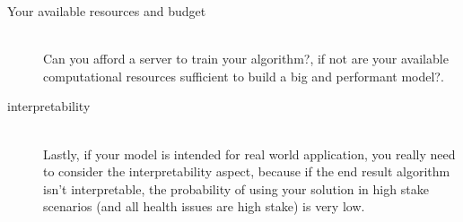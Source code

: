 \begin{description}
        \item [Your available resources and budget] \hfill \\
            Can you afford a server to train your algorithm?, if not are your available computational resources sufficient to build a big and performant model?.
        \item [interpretability] \hfill \\
            Lastly, if your model is intended for real world application, you really need to consider the interpretability aspect, because if the end result algorithm isn't interpretable, the probability of using your solution in high stake scenarios (and all health issues are high stake) is very low.
    \end{description}